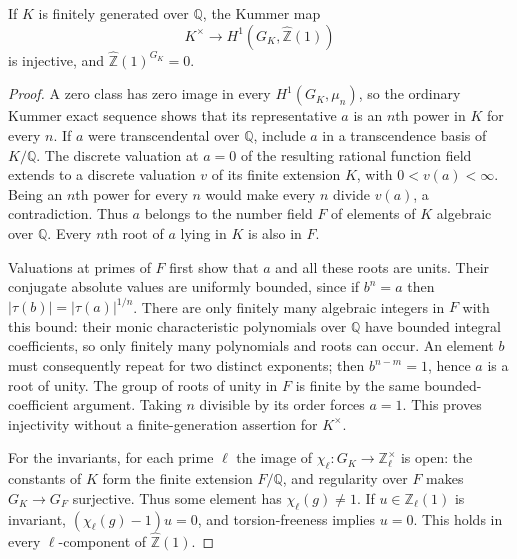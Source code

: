 \begin{lemma}
\label{A:Kummer-faithfulness}
If $K$ is finitely generated over $\mathbb Q$, the Kummer map
\[
 K^\times\longrightarrow H^1(G_K,\widehat{\mathbb Z}(1))
\]
is injective, and $\widehat{\mathbb Z}(1)^{G_K}=0$.
\end{lemma}

\begin{proof}
A zero class has zero image in every $H^1(G_K,\mu_n)$, so the ordinary
Kummer exact sequence shows that its representative $a$ is an $n$th
power in $K$ for every $n$. If $a$ were transcendental over $\mathbb Q$,
include $a$ in a transcendence basis of $K/\mathbb Q$. The discrete
valuation at $a=0$ of the resulting rational function field extends to
a discrete valuation $v$ of its finite extension $K$, with
$0<v(a)<\infty$. Being an $n$th power for every $n$ would make every
$n$ divide $v(a)$, a contradiction. Thus $a$ belongs to the number
field $F$ of elements of $K$ algebraic over $\mathbb Q$. Every $n$th
root of $a$ lying in $K$ is also in $F$.

Valuations at primes of $F$ first show that $a$ and all these roots
are units. Their conjugate absolute values are uniformly bounded,
since if $b^n=a$ then $|\tau(b)|=|\tau(a)|^{1/n}$. There are only
finitely many algebraic integers in $F$ with this bound: their monic
characteristic polynomials over $\mathbb Q$ have bounded integral
coefficients, so only finitely many polynomials and roots can occur.
An element $b$ must consequently repeat for two distinct exponents;
then $b^{n-m}=1$, hence $a$ is a root of unity. The group of roots of
unity in $F$ is finite by the same bounded-coefficient argument.
Taking $n$ divisible by its order forces $a=1$. This proves injectivity
without a finite-generation assertion for $K^\times$.

For the invariants, for each prime $\ell$ the image of
$\chi_\ell:G_K\to\mathbb Z_\ell^\times$ is open: the constants of
$K$ form the finite extension $F/\mathbb Q$, and regularity over $F$
makes $G_K\to G_F$ surjective. Thus some element has
$\chi_\ell(g)\ne1$. If $u\in\mathbb Z_\ell(1)$ is invariant,
$(\chi_\ell(g)-1)u=0$, and torsion-freeness implies $u=0$.
This holds in every $\ell$-component of $\widehat{\mathbb Z}(1)$.
\end{proof}

